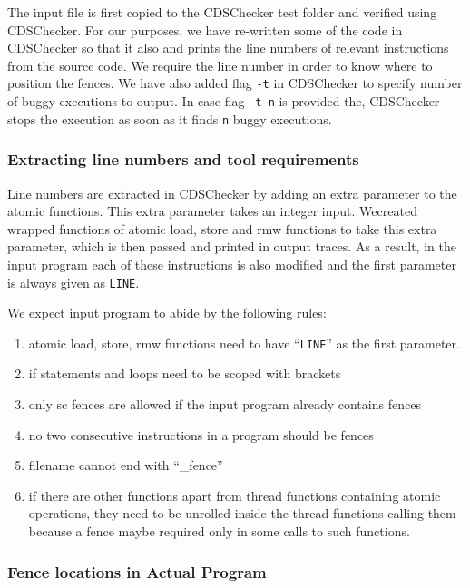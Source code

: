 The input file is first copied to the CDSChecker test folder and 
verified using CDSChecker. 
For our purposes, we have re-written some of the code in CDSChecker 
so that it also and prints the line numbers of relevant instructions 
from the source code. We require the line number in order to know 
where to position the fences. We have also added flag \texttt{-t} 
in CDSChecker to specify number of buggy executions to output. In 
case flag \texttt{-t n} is provided the, CDSChecker stops the execution 
as soon as it finds \texttt{n} buggy executions.


\subsubsection{Extracting line numbers and tool requirements}
Line numbers are extracted in CDSChecker by adding an extra parameter 
to the atomic functions. This extra parameter takes an integer input. 
Wecreated wrapped functions of atomic load, store and rmw functions 
to take this extra parameter, which is then passed and printed in 
output traces. As a result, in the input program each of these 
instructions is also modified and the first parameter is always 
given as {\tt{\textunderscore\textunderscore LINE\textunderscore\textunderscore}}.

We expect input program to abide by the following rules:
\begin{enumerate}
	\item atomic load, store, rmw functions need to have 
	``{\tt{\textunderscore\textunderscore LINE\textunderscore\textunderscore}}'' 
	as the first parameter.
	\item if statements and loops need to be scoped with 
	brackets %
	\item only sc fences are allowed if the input program 
	already contains fences
	\item no two consecutive instructions in a program should be fences 
	\item filename cannot end with ``\_fence''
	\item if there are other functions apart from thread functions 
	containing atomic operations, they need to be unrolled inside the 
	thread functions calling them because a fence maybe required only 
	in some calls to such functions.
\end{enumerate}

\subsubsection{Fence locations in Actual Program}\

